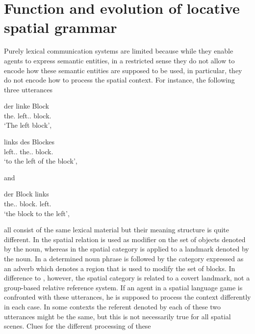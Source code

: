 %

\chapter{Function and evolution of locative spatial grammar}
\label{s:grammar}
Purely lexical communication systems are limited
because while they enable agents to express semantic entities, in a restricted sense 
they do not allow to encode how these semantic entities are supposed to be used,
in particular, they do not encode how to process the spatial context.
For instance, the following three utterances 

\begin{exe}
\ex\label{e:der-linke-block}
\gll der linke Block\\
{the.\NOM} {left.\ADJ.\NOM} block.\NOM\\
\glt `The left block',
\end{exe}
\begin{exe}
\ex\label{e:links-des-blockes}
\gll links des Blockes\\
{left.\PREP.\GEN} {the.\DET.\GEN} block.\GEN \\
\glt `to the left of the block',
\end{exe}
and
\begin{exe}
\ex\label{e:der-block-links}
\gll der Block links\\
{the.\DET.\NOM} {block.\NOM} left.\ADV\\
\glt `the block to the left',
\end{exe}
all consist of the same lexical material but their meaning structure is quite different.
In  the spatial relation is used as modifier on the set of
objects denoted by the noun, whereas in  the
spatial category is applied to a landmark denoted by the noun. In 
a determined noun phrase is followed by the category expressed as an adverb which
denotes a region that is used to modify the set of blocks. In difference to , 
however, the spatial category is related to a covert landmark, not a 
group-based relative reference system.
If an agent in a spatial language game is confronted with these utterances, he is supposed to 
process the context differently in each case. In some contexts the referent
denoted by each of these two utterances might be the same, but this is not necessarily
true for all spatial scenes. Clues for the different processing of these
